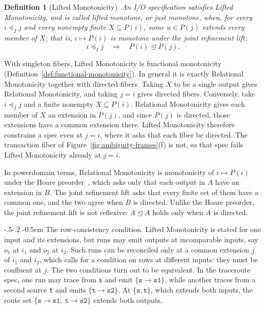 \documentclass[sigconf]{cidr-2027}
\makeatletter
\newtheorem{definition}{Definition}
\theoremstyle{remark}
\renewcommand\paragraph{\@startsection{paragraph}{4}{\z@}%
  {-.5\baselineskip \@plus -2\p@ \@minus -.2\p@}%
  {-0.5em}%
  {\normalfont\bfseries}}
\newcommand{\InputOrd}{\preceq_I}
\newcommand{\LiftedOrd}{\trianglelefteq}
\newcommand{\inrel}{extends\xspace}          %
\newcommand{\outrel}{extends\xspace}          %
\newcommand{\spectype}[1][]{I/O specification#1\xspace}
\newcommand{\fiber}[1]{P(#1)}
\makeatother
\begin{document}
\begin{definition}[Lifted Monotonicity]
\label{def:lifted-monotonicity}
\textcolor{reviewed}{An \spectype satisfies \emph{Lifted Monotonicity}, and
is called \emph{lifted monotone}, or just \emph{monotone}, when, for every $i\InputOrd j$ and every nonempty
finite $X\subseteq\fiber{i}$, some $u\in\fiber{j}$ \outrel every member of $X$;
that is, $i\mapsto\fiber{i}$ is monotone under the joint refinement lift:}
        \begin{equation}
  i\InputOrd j
  \quad\Longrightarrow\quad
  \fiber{i}\LiftedOrd\fiber{j}.
  \label{eq:lifted-monotonicity}
        \end{equation}
\end{definition}

\textcolor{reviewed}{With singleton fibers, Lifted Monotonicity is functional monotonicity
(Definition~\ref{def:functional-monotonicity}).} In general it is exactly
Relational Monotonicity together with directed fibers. Taking $X$ to be a
single output gives Relational Monotonicity, and taking $j=i$ gives directed
fibers. Conversely, take $i\InputOrd j$ and a finite nonempty
$X\subseteq\fiber{i}$. Relational Monotonicity gives each member of $X$ an extension in $\fiber{j}$, and since $\fiber{j}$ is directed, those extensions have a common extension there. Lifted Monotonicity therefore constrains a spec
even at $j=i$, where it asks that each fiber be directed. The transaction
fiber of Figure~\ref{fig:ambiguity-frames}(f) is not, so that spec fails
Lifted Monotonicity already at $j=i$.

In powerdomain terms, Relational Monotonicity is monotonicity of
$i\mapsto\fiber{i}$ under the Hoare preorder~\cite{abramsky1994domain}, which
asks only that each output in $A$ have an extension in $B$. The joint
refinement lift asks that every finite set of them have a common one, and the
two agree when $B$ is directed. Unlike the Hoare preorder, the joint
refinement lift is not reflexive: $A\LiftedOrd A$ holds only when $A$ is
directed.

\paragraph{The row-consistency condition.}
\textcolor{reviewed}{Lifted Monotonicity is stated for one input and its extensions, but runs may
emit outputs at incomparable inputs, say $o_1$ at $i_1$ and $o_2$ at $i_2$.} \textcolor{reviewed}{Such runs can be reconciled only at a common extension $j$ of $i_1$ and $i_2$, which calls for a condition on rows at different inputs: they must be confluent at $j$.} \textcolor{reviewed}{The two conditions turn out to be equivalent.} \textcolor{reviewed}{In the traceroute spec, one run may trace from \texttt{s} and emit
$\{\texttt{s}{\to}\texttt{s1}\}$, while another traces from a second source
\texttt{t} and emits $\{\texttt{t}{\to}\texttt{s2}\}$.} \textcolor{reviewed}{At $\{\texttt{s},\texttt{t}\}$, which \inrel both inputs, the route set $\{\texttt{s}{\to}\texttt{s1},\ \texttt{t}{\to}\texttt{s2}\}$ \outrel both outputs.}
\end{document}
